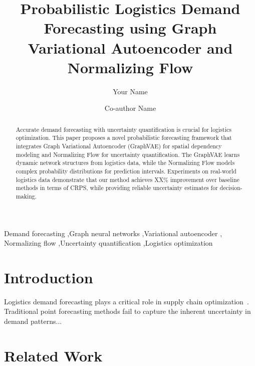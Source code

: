 \documentclass[review]{elsarticle}
\begin{document}
\begin{frontmatter}

\title{Probabilistic Logistics Demand Forecasting using Graph Variational Autoencoder and Normalizing Flow}

\author[inst1]{Your Name}

\author[inst1]{Co-author Name}

\address[inst1]{Department, University, City, Country}

\begin{abstract}
Accurate demand forecasting with uncertainty quantification is crucial for logistics optimization.
This paper proposes a novel probabilistic forecasting framework that integrates Graph Variational
Autoencoder (GraphVAE) for spatial dependency modeling and Normalizing Flow for uncertainty
quantification. The GraphVAE learns dynamic network structures from logistics data, while the
Normalizing Flow models complex probability distributions for prediction intervals. Experiments
on real-world logistics data demonstrate that our method achieves XX\% improvement over baseline
methods in terms of CRPS, while providing reliable uncertainty estimates for decision-making.
\end{abstract}

\begin{keyword}
Demand forecasting \sep Graph neural networks \sep Variational autoencoder \sep
Normalizing flow \sep Uncertainty quantification \sep Logistics optimization
\end{keyword}

\end{frontmatter}

\linenumbers

\section{Introduction}
\label{sec:introduction}

Logistics demand forecasting plays a critical role in supply chain optimization~\cite{ref1}.
Traditional point forecasting methods fail to capture the inherent uncertainty in demand patterns...


\section{Related Work}
\label{sec:related}
\end{document}
